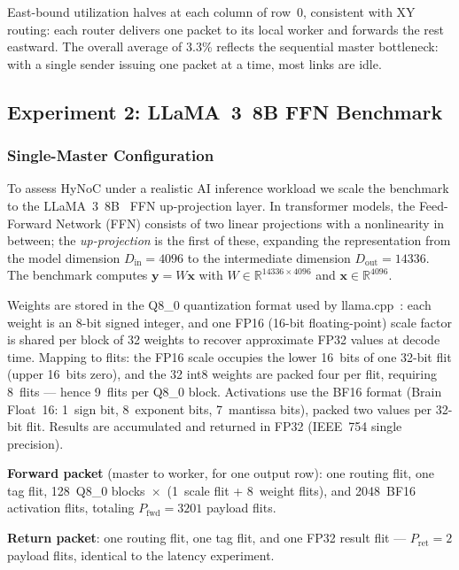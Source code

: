 East-bound utilization halves at each column of row~0, consistent with XY
routing: each router delivers one packet to its local worker and forwards the
rest eastward.  The overall average of 3.3\% reflects the sequential master
bottleneck: with a single sender issuing one packet at a time, most links are
idle.

\subsection{Experiment 2: LLaMA~3~8B FFN Benchmark}

\subsubsection{Single-Master Configuration}
\label{sec:large-matmul}

To assess HyNoC under a realistic AI inference workload we scale the benchmark
to the LLaMA~3~8B~\cite{llama3} FFN up-projection layer.  In transformer
models, the Feed-Forward Network (FFN) consists of two linear projections with
a nonlinearity in between; the \emph{up-projection} is the first of these,
expanding the representation from the model dimension $D_\text{in}=4096$ to
the intermediate dimension $D_\text{out}=14336$.  The benchmark computes
$\mathbf{y}=W\mathbf{x}$ with $W\in\mathbb{R}^{14336\times4096}$ and
$\mathbf{x}\in\mathbb{R}^{4096}$.

Weights are stored in the Q8\_0 quantization format used by
llama.cpp~\cite{llama_cpp}: each weight is an 8-bit signed integer, and one
FP16 (16-bit floating-point) scale factor is shared per block of 32 weights to
recover approximate FP32 values at decode time.  Mapping to flits: the FP16
scale occupies the lower 16~bits of one 32-bit flit (upper 16~bits zero), and
the 32 int8 weights are packed four per flit, requiring 8~flits --- hence
9~flits per Q8\_0 block.  Activations use the BF16 format (Brain
Float~16: 1~sign bit, 8~exponent bits, 7~mantissa bits), packed two values per
32-bit flit.  Results are accumulated and returned in FP32 (IEEE~754 single
precision).

\textbf{Forward packet} (master to worker, for one output row): one routing
flit, one tag flit, 128~Q8\_0 blocks~$\times$~(1~scale flit + 8~weight flits),
and 2048~BF16 activation flits, totaling $P_\text{fwd}=3201$ payload flits.

\textbf{Return packet}: one routing flit, one tag flit, and one FP32 result
flit --- $P_\text{ret}=2$ payload flits, identical to the latency experiment.

